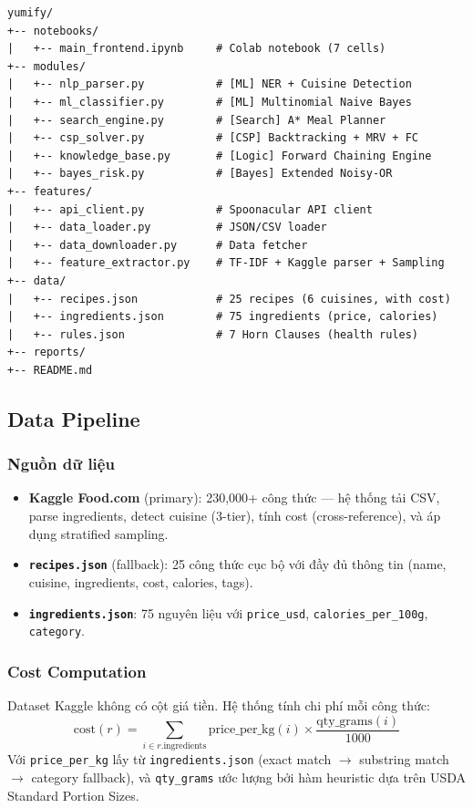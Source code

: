 \begin{lstlisting}[language={}, caption=Cấu trúc dự án]
yumify/
+-- notebooks/
|   +-- main_frontend.ipynb     # Colab notebook (7 cells)
+-- modules/
|   +-- nlp_parser.py           # [ML] NER + Cuisine Detection
|   +-- ml_classifier.py        # [ML] Multinomial Naive Bayes
|   +-- search_engine.py        # [Search] A* Meal Planner
|   +-- csp_solver.py           # [CSP] Backtracking + MRV + FC
|   +-- knowledge_base.py       # [Logic] Forward Chaining Engine
|   +-- bayes_risk.py           # [Bayes] Extended Noisy-OR
+-- features/
|   +-- api_client.py           # Spoonacular API client
|   +-- data_loader.py          # JSON/CSV loader
|   +-- data_downloader.py      # Data fetcher
|   +-- feature_extractor.py    # TF-IDF + Kaggle parser + Sampling
+-- data/
|   +-- recipes.json            # 25 recipes (6 cuisines, with cost)
|   +-- ingredients.json        # 75 ingredients (price, calories)
|   +-- rules.json              # 7 Horn Clauses (health rules)
+-- reports/
+-- README.md
\end{lstlisting}

\subsection{Data Pipeline}

\subsubsection{Nguồn dữ liệu}
\begin{itemize}
  \item \textbf{Kaggle Food.com} (primary): 230,000+ công thức --- hệ thống tải CSV, parse ingredients, detect cuisine (3-tier), tính cost (cross-reference), và áp dụng stratified sampling.
  \item \textbf{\texttt{recipes.json}} (fallback): 25 công thức cục bộ với đầy đủ thông tin (name, cuisine, ingredients, cost, calories, tags).
  \item \textbf{\texttt{ingredients.json}}: 75 nguyên liệu với \texttt{price\_usd}, \texttt{calories\_per\_100g}, \texttt{category}.
\end{itemize}

\subsubsection{Cost Computation}
Dataset Kaggle không có cột giá tiền. Hệ thống tính chi phí mỗi công thức:
\begin{equation}
\text{cost}(r) = \sum_{i \in r.\text{ingredients}} \text{price\_per\_kg}(i) \times \frac{\text{qty\_grams}(i)}{1000}
\end{equation}
Với \texttt{price\_per\_kg} lấy từ \texttt{ingredients.json} (exact match $\to$ substring match $\to$ category fallback), và \texttt{qty\_grams} ước lượng bởi hàm heuristic dựa trên USDA Standard Portion Sizes.

